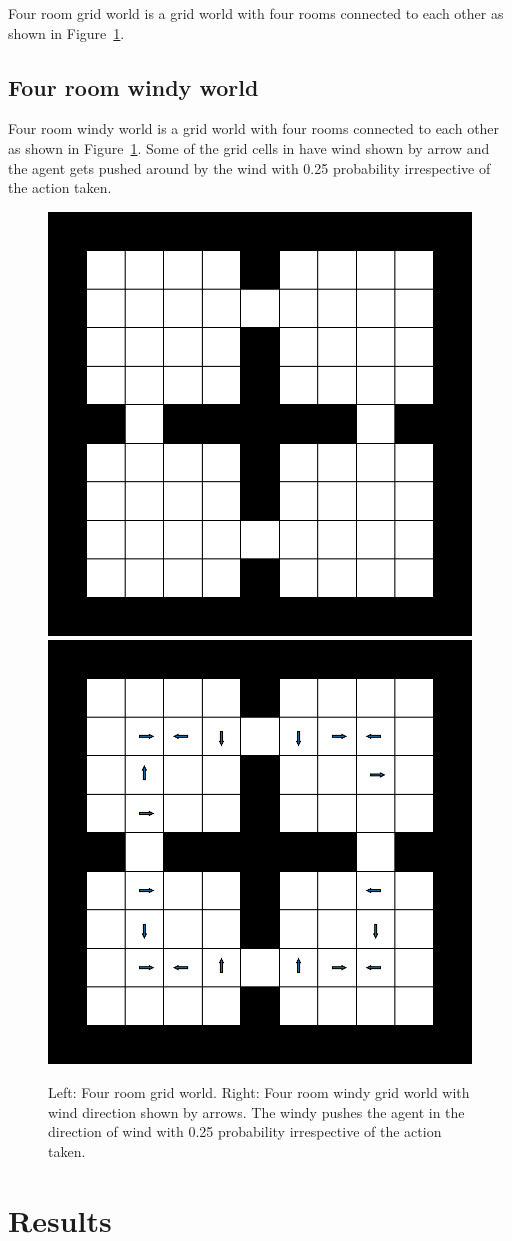 \documentclass[letterpaper]{article} %
\begin{document}
Four room grid world is a grid world with four rooms connected to each other as shown in Figure~\ref{fig:four-room-grid-world}.

\subsection{Four room windy world}

Four room windy world is a grid world with four rooms connected to each other as shown in Figure~\ref{fig:four-room-grid-world}.
Some of the grid cells in have wind shown by arrow and the agent gets pushed around by
the wind with 0.25 probability irrespective of the action taken.


%
\begin{figure}%
\includegraphics[width=0.48\columnwidth]{media/4-room-grid-world.pdf}
\hfill
\includegraphics[width=0.48\columnwidth]{media/4-room-windy-world.pdf}%
\caption{Left: Four room grid world. Right: Four room windy grid world with wind direction shown by arrows. The windy pushes the agent in the direction of wind with 0.25 probability irrespective of the action taken.}
\label{fig:four-room-grid-world}%
\end{figure}%
%

\section{Results}
\end{document}
